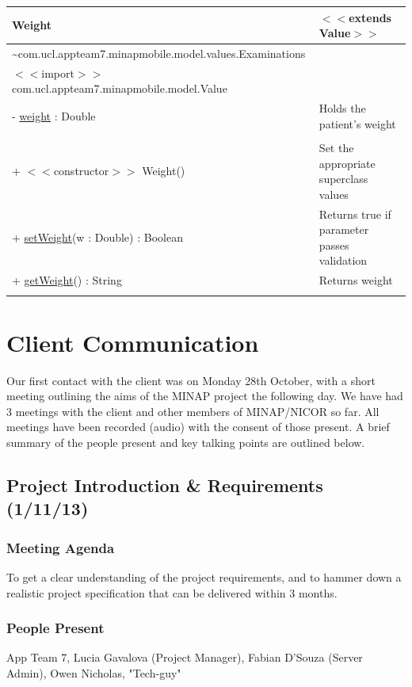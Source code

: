 \documentclass[12pt,a4paper,oneside,titlepage]{article}
\begin{document}
\begin{center}
	\begin{tabular}{| p{13cm} | p{5cm} |}
	\hline
	\textbf{Weight} & \textbf{$<<$extends Value$>>$} \\ \hline
	\textasciitilde com.ucl.appteam7.minapmobile.model.values.Examinations	 &  \\ \hline
$<<$import$>>$ com.ucl.appteam7.minapmobile.model.Value	&  \\ \hline \hline
- \underline{weight} : Double & 	Holds the patient's weight \\ &\\ \hline \hline
+ $<<$constructor$>>$ Weight()	 & Set the appropriate superclass values \\ \hline
+ \underline{setWeight}(w : Double) : Boolean	 & Returns true if parameter passes validation \\ \hline
+ \underline{getWeight}() : String & 	Returns weight \\&\\ \hline
	\end{tabular}
\end{center}

\restoregeometry

\newpage
\section{Client Communication}
Our first contact with the client was on Monday 28th October, with a short meeting outlining the aims of the MINAP project the following day. We have had 3 meetings with the client and other members of MINAP/NICOR so far. All meetings have been recorded (audio) with the consent of those present. A brief summary of the people present and key talking points are outlined below.
\subsection{Project Introduction \& Requirements (1/11/13)}
\subsubsection{Meeting Agenda}
To get a clear understanding of the project requirements, and to hammer down a realistic project specification that can be delivered within 3 months. 
\subsubsection{People Present}
App Team 7, Lucia Gavalova (Project Manager), Fabian D'Souza (Server Admin), Owen Nicholas, "Tech-guy"
\end{document}
